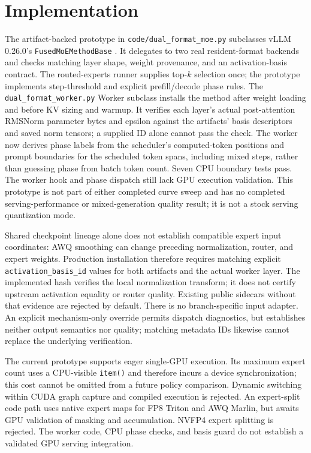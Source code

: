 \documentclass[10pt,twocolumn]{article}
\begin{document}
\section{Implementation}
The artifact-backed prototype in \texttt{code/dual\_format\_moe.py} subclasses
vLLM 0.26.0's \texttt{FusedMoEMethodBase} \citep{vllm026}. It delegates to two
real resident-format backends and checks matching layer shape, weight
provenance, and an activation-basis contract. The routed-experts
runner supplies top-$k$ selection once; the
prototype implements step-threshold and explicit prefill/decode phase rules.
The \texttt{dual\_format\_worker.py} Worker subclass installs the method
after weight loading and before KV sizing and warmup. It verifies each
layer's actual post-attention RMSNorm parameter bytes and epsilon against
the artifacts' basis descriptors and saved norm tensors; a supplied ID
alone cannot pass the check. The worker now derives phase labels from
the scheduler's computed-token positions and prompt boundaries for the
scheduled token spans, including mixed steps, rather than guessing phase
from batch token count. Seven CPU boundary tests pass. The worker hook and
phase dispatch still lack GPU execution validation. This prototype is not
part of either completed curve sweep and has no completed serving-performance
or mixed-generation quality result; it is not a stock serving quantization mode.

Shared checkpoint lineage alone does not establish compatible expert input
coordinates: AWQ smoothing can change preceding normalization, router, and
expert weights. Production installation therefore requires matching explicit
\texttt{activation\_basis\_id} values for both artifacts and the actual
worker layer. The implemented hash verifies the local normalization
transform; it does not certify upstream activation equality or router
quality. Existing
public sidecars without that evidence are rejected by default. There is no
branch-specific input adapter. An explicit mechanism-only override permits
dispatch diagnostics, but establishes neither output semantics nor quality;
matching metadata IDs likewise cannot replace the underlying verification.

The current prototype supports eager single-GPU execution. Its maximum
expert count uses a CPU-visible \texttt{item()} and therefore incurs a device
synchronization; this cost cannot be omitted from a future policy comparison.
Dynamic switching within CUDA graph capture and compiled execution is
rejected. An expert-split code path uses native expert maps for FP8 Triton
and AWQ Marlin, but awaits GPU validation of masking and accumulation.
NVFP4 expert splitting is rejected. The worker code, CPU phase checks, and
basis guard do not establish a validated GPU serving integration.
\end{document}
